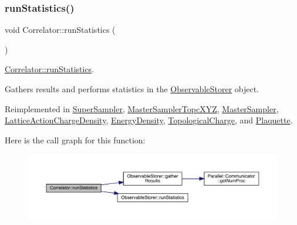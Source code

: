\subsubsection{\texorpdfstring{runStatistics()}{runStatistics()}}
{\footnotesize\ttfamily void Correlator\+::run\+Statistics (\begin{DoxyParamCaption}{ }\end{DoxyParamCaption})\hspace{0.3cm}{\ttfamily [virtual]}}



\mbox{\hyperlink{class_correlator_a35197b1d12b62ef30b79c0138a26456e}{Correlator\+::run\+Statistics}}. 

Gathers results and performs statistics in the \mbox{\hyperlink{class_observable_storer}{Observable\+Storer}} object. 

Reimplemented in \mbox{\hyperlink{class_super_sampler_af96f7d461e9159adb4eef9bda9c6ecde}{Super\+Sampler}}, \mbox{\hyperlink{class_master_sampler_topc_x_y_z_af748653ded9908f78383185475b9ddeb}{Master\+Sampler\+Topc\+X\+YZ}}, \mbox{\hyperlink{class_master_sampler_ab7913d0dbdea57af3f469a3cdd74f8fc}{Master\+Sampler}}, \mbox{\hyperlink{class_lattice_action_charge_density_a21d608703811d2814e7f654588eaa0c0}{Lattice\+Action\+Charge\+Density}}, \mbox{\hyperlink{class_energy_density_a584e164453ce880a45478c9b48ce2c4b}{Energy\+Density}}, \mbox{\hyperlink{class_topological_charge_ab9afadb9f37e638c0a168ebab5d41353}{Topological\+Charge}}, and \mbox{\hyperlink{class_plaquette_aa54bf1807d9b192048026f94d585fa4f}{Plaquette}}.

Here is the call graph for this function\+:
\nopagebreak
\begin{figure}[H]
\begin{center}
\leavevmode
\includegraphics[width=350pt]{class_correlator_a35197b1d12b62ef30b79c0138a26456e_cgraph}
\end{center}
\end{figure}
\mbox{\label{class_correlator_a168512b2ce182d9478db47f100125fa6}} 
